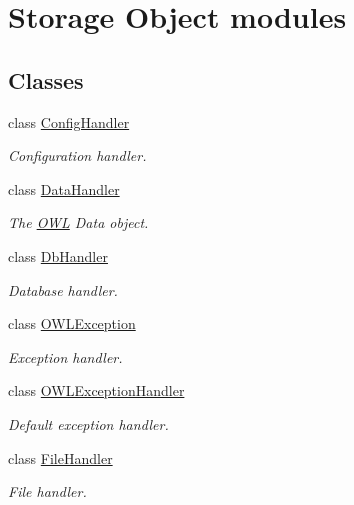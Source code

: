 \section{Storage Object modules}
\label{group__OWL__SO__LAYER}
\subsection*{Classes}
\begin{DoxyCompactItemize}
\item 
class \hyperlink{classConfigHandler}{ConfigHandler}
\begin{DoxyCompactList}\small\item\em Configuration handler. \item\end{DoxyCompactList}\item 
class \hyperlink{classDataHandler}{DataHandler}
\begin{DoxyCompactList}\small\item\em The \hyperlink{classOWL}{OWL} Data object. \item\end{DoxyCompactList}\item 
class \hyperlink{classDbHandler}{DbHandler}
\begin{DoxyCompactList}\small\item\em Database handler. \item\end{DoxyCompactList}\item 
class \hyperlink{classOWLException}{OWLException}
\begin{DoxyCompactList}\small\item\em Exception handler. \item\end{DoxyCompactList}\item 
class \hyperlink{classOWLExceptionHandler}{OWLExceptionHandler}
\begin{DoxyCompactList}\small\item\em Default exception handler. \item\end{DoxyCompactList}\item 
class \hyperlink{classFileHandler}{FileHandler}
\begin{DoxyCompactList}\small\item\em File handler. \item\end{DoxyCompactList}\item 

\end{DoxyCompactItemize}
